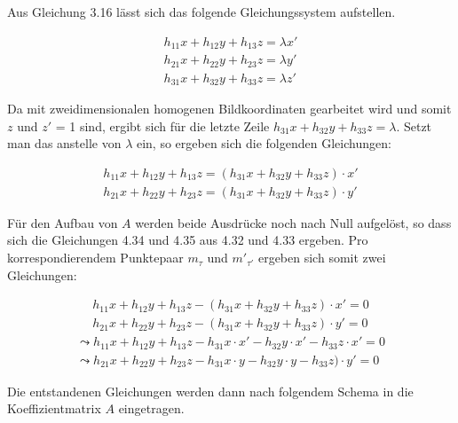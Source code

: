 Aus Gleichung 3.16 lässt sich das folgende Gleichungssystem aufstellen.  

\begin{gather}
	h_{11}x+h_{12}y+h_{13}z= \lambda x'\\
	h_{21}x+h_{22}y+h_{23}z= \lambda y'\\
	h_{31}x+h_{32}y+h_{33}z= \lambda z'
\end{gather}

Da mit zweidimensionalen homogenen Bildkoordinaten gearbeitet wird und somit $z$ und $z'$ = 1 sind, ergibt sich für die letzte Zeile $h_{31}x+h_{32}y+h_{33}z= \lambda$. Setzt man das anstelle von $\lambda$ ein, so ergeben sich die folgenden Gleichungen:


\begin{gather}
	h_{11}x+h_{12}y+h_{13}z= (h_{31}x+h_{32}y+h_{33}z) \cdot x'\\
	h_{21}x+h_{22}y+h_{23}z= (h_{31}x+h_{32}y+h_{33}z) \cdot y'
\end{gather}

Für den Aufbau von $A$ werden beide Ausdrücke noch nach Null aufgelöst, so dass sich die Gleichungen 4.34 und 4.35 aus 4.32 und 4.33 ergeben. Pro korrespondierendem Punktepaar $m_\tau$ und $m'_{\tau'}$ ergeben sich somit zwei Gleichungen:

\begin{gather}
	h_{11}x+h_{12}y+h_{13}z -(h_{31}x+h_{32}y+h_{33}z) \cdot x'= 0 \\	h_{21}x+h_{22}y+h_{23}z-(h_{31}x+h_{32}y+h_{33}z) \cdot y'=0
\end{gather}
\begin{gather}
	\leadsto h_{11}x+h_{12}y+h_{13}z -h_{31}x\cdot x' - h_{32}y \cdot x'-h_{33}z\cdot x'= 0\\
	\leadsto h_{21}x+h_{22}y+h_{23}z-h_{31}x\cdot y -h_{32}y \cdot y -h_{33}z) \cdot y'=0
\end{gather}

Die entstandenen Gleichungen werden dann nach folgendem Schema in die Koeffizientmatrix $A$ eingetragen.\cite{Elements,HZ,Schwarz,Heipke}

